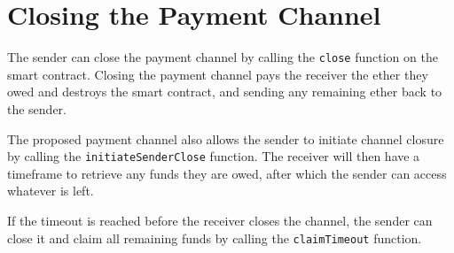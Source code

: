\section{Closing the Payment Channel}\label{sec:closing-the-payment-channel}
The sender can close the payment channel by calling the \texttt{close} function
on the smart contract.
Closing the payment channel pays the receiver the ether they owed and destroys
the smart contract, and sending any remaining ether back to the sender.



The proposed payment channel also allows the sender to initiate channel closure
by calling the \texttt{initiateSenderClose} function.
The receiver will then have a timeframe to retrieve any funds they are owed,
after which the sender can access whatever is left.



If the timeout is reached before the receiver closes the channel, the sender can
close it and claim all remaining funds by calling the \texttt{claimTimeout}
function.

